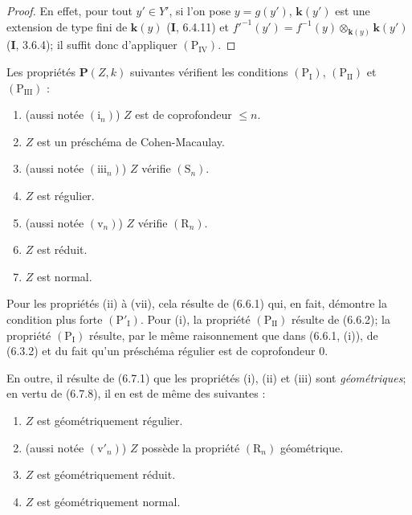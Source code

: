 \begin{proof}
En effet, pour tout $y'\in Y'$, si l'on pose $y=g(y')$, $\boldsymbol{k}(y')$ est une
extension de type fini de $\boldsymbol{k}(y)$ (\textbf{I}, 6.4.11) et
$f'^{-1}(y')=f^{-1}(y)\otimes_{\mathbf{k}(y)}\boldsymbol{k}(y')$ (\textbf{I}, 3.6.4); il suffit donc
d'appliquer $(\mathrm P_{\mathrm{IV}})$.
\end{proof}

\begin{examples}[7.3.8]
\label{IV.2.s7.3.8-fr}
Les propriétés $\boldsymbol P(Z,k)$ suivantes
vérifient les conditions $(\mathrm P_{\mathrm I})$,
$(\mathrm P_{\mathrm{II}})$ et $(\mathrm P_{\mathrm{III}})$ :
\begin{enumerate}
\item[(i)] (aussi notée $(\mathrm i_n)$) $Z$ est de coprofondeur
$\leqslant n$.
\item[(ii)] $Z$ est un préschéma de Cohen-Macaulay.
\item[(iii)] (aussi notée $(\mathrm{iii}_n)$) $Z$ vérifie $(\mathrm S_n)$.
\item[(iv)] $Z$ est régulier.
\item[(v)] (aussi notée $(\mathrm v_n)$) $Z$ vérifie $(\mathrm R_n)$.
\item[(vi)] $Z$ est réduit.
\item[(vii)] $Z$ est normal.
\end{enumerate}

Pour les propriétés (ii) à (vii), cela résulte de (6.6.1) qui, en fait,
démontre la condition plus forte $(\mathrm P'_{\mathrm I})$. Pour (i), la
propriété $(\mathrm P_{\mathrm{II}})$ résulte de (6.6.2); la propriété
$(\mathrm P_{\mathrm I})$ résulte, par le même raisonnement que dans
(6.6.1, (i)), de (6.3.2) et du fait qu'un préschéma régulier est de
coprofondeur 0.

En outre, il résulte de (6.7.1) que les propriétés (i), (ii) et (iii) sont
\emph{géométriques}; en vertu de (6.7.8), il en est de même des suivantes :
\begin{enumerate}
\item[(iv$'$)] $Z$ est géométriquement régulier.
\item[(v$'$)] (aussi notée $(\mathrm v'_n)$) $Z$ possède la propriété
$(\mathrm R_n)$ géométrique.
\item[(vi$'$)] $Z$ est géométriquement réduit.
\item[(vii$'$)] $Z$ est géométriquement normal.
\end{enumerate}
\end{examples}

